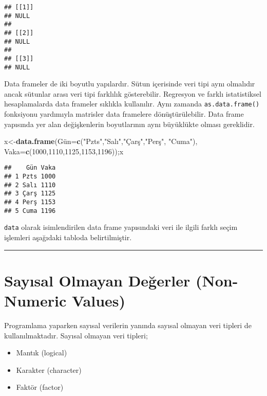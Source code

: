 \documentclass[
]{book}
\newenvironment{Shaded}{\begin{snugshade}}{\end{snugshade}}
\newcommand{\DataTypeTok}[1]{\textcolor[rgb]{0.13,0.29,0.53}{#1}}
\newcommand{\DecValTok}[1]{\textcolor[rgb]{0.00,0.00,0.81}{#1}}
\newcommand{\KeywordTok}[1]{\textcolor[rgb]{0.13,0.29,0.53}{\textbf{#1}}}
\newcommand{\NormalTok}[1]{#1}
\newcommand{\StringTok}[1]{\textcolor[rgb]{0.31,0.60,0.02}{#1}}
\providecommand{\tightlist}{%
  \setlength{\itemsep}{0pt}\setlength{\parskip}{0pt}}
\begin{document}
\begin{verbatim}
## [[1]]
## NULL
## 
## [[2]]
## NULL
## 
## [[3]]
## NULL
\end{verbatim}

Data frameler de iki boyutlu yapılardır. Sütun içerisinde veri tipi aynı olmalıdır ancak sütunlar arası veri tipi farklılık gösterebilir. Regresyon ve farklı istatistiksel hesaplamalarda data frameler sıklıkla kullanılır. Aynı zamanda \texttt{as.data.frame()} fonksiyonu yardımıyla matrisler data framelere dönüştürülebilir. Data frame yapısında yer alan değişkenlerin boyutlarının aynı büyüklükte olması gereklidir.

\begin{Shaded}
\begin{Highlighting}[]
\NormalTok{x<-}\KeywordTok{data.frame}\NormalTok{(Gün=}\KeywordTok{c}\NormalTok{(}\StringTok{"Pzts"}\NormalTok{,}\StringTok{"Salı"}\NormalTok{,}\StringTok{"Çarş"}\NormalTok{,}\StringTok{"Perş"}\NormalTok{, }\StringTok{"Cuma"}\NormalTok{), }\DataTypeTok{Vaka=}\KeywordTok{c}\NormalTok{(}\DecValTok{1000}\NormalTok{,}\DecValTok{1110}\NormalTok{,}\DecValTok{1125}\NormalTok{,}\DecValTok{1153}\NormalTok{,}\DecValTok{1196}\NormalTok{));x}
\end{Highlighting}
\end{Shaded}

\begin{verbatim}
##    Gün Vaka
## 1 Pzts 1000
## 2 Salı 1110
## 3 Çarş 1125
## 4 Perş 1153
## 5 Cuma 1196
\end{verbatim}

\texttt{data} olarak isimlendirilen data frame yapısındaki veri ile ilgili farklı seçim işlemleri aşağıdaki tabloda belirtilmiştir.

\begin{center}\rule{0.5\linewidth}{0.5pt}\end{center}

\hypertarget{sayux131sal-olmayan-deux11ferler-non-numeric-values}{%
\section{Sayısal Olmayan Değerler (Non-Numeric Values)}\label{sayux131sal-olmayan-deux11ferler-non-numeric-values}}

Programlama yaparken sayısal verilerin yanında sayısal olmayan veri tipleri de kullanılmaktadır. Sayısal olmayan veri tipleri;

\begin{itemize}
\tightlist
\item
  Mantık (logical)
\item
  Karakter (character)
\item
  Faktör (factor)
\end{itemize}
\end{document}
